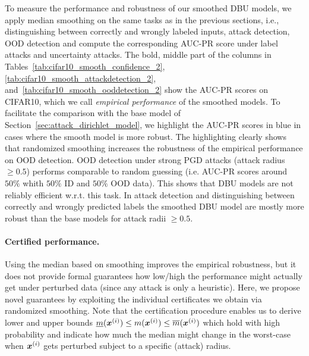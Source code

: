 To measure the performance and robustness of our smoothed DBU models, we apply median smoothing on the same tasks as in the previous sections, i.e., distinguishing between correctly and wrongly labeled inputs, attack detection, OOD detection and compute the corresponding AUC-PR score under label attacks and uncertainty attacks. 
The bold, middle part of the columns in Tables~\ref{tab:cifar10_smooth_confidence_2}, \ref{tab:cifar10_smooth_attackdetection_2}, and~\ref{tab:cifar10_smooth_ooddetection_2} show the AUC-PR scores on CIFAR10, which we call \emph{empirical performance} of the smoothed models. To facilitate the comparison with the base model of Section~\ref{sec:attack_dirichlet_model}, we highlight the AUC-PR scores in blue in cases where the smooth model is more robust. The highlighting clearly shows that randomized smoothing increases the robustness of the empirical performance on OOD detection. 
OOD detection under strong PGD attacks (attack radius $\geq 0.5$) performs comparable to random guessing (i.e. AUC-PR scores around $50\%$ whith $50\%$ ID and $50\%$ OOD data). This shows that DBU models are not reliably efficient w.r.t. this task.
In attack detection and distinguishing between correctly and wrongly predicted labels the smoothed DBU model are mostly more robust than the base models for attack radii $\geq 0.5$.

\paragraph{Certified performance.} Using the median based on smoothing improves the empirical robustness, but it does not provide formal guarantees how low/high the performance might actually get under perturbed data (since any attack is only a heuristic). 
Here, we propose novel guarantees by exploiting the individual certificates we obtain via randomized smoothing.
 Note that the certification procedure \citep{median_smoothing} enables us to derive lower and upper bounds $\underline{m}({\bm{x}}^{(i)}) \leq m({\bm{x}}^{(i)}) \leq \overline{m}({\bm{x}}^{(i)})$ which hold with high probability and indicate how much the median might change in the worst-case when ${\bm{x}}^{(i)}$ gets perturbed subject to a specific (attack) radius.
 
